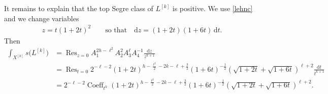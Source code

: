 It remains to explain that the top Segre class of $L^{[k]}$ is positive. We use \eqref{lehnc} and we change variables
\begin{gather*}
z=t(1+2t)^2\qquad \text{so that}\quad \mathrm dz=(1+2t)(1+6t)\,{\mathrm dt}.
\end{gather*}
Then
\begin{align}
\int_{X^{[k]}} s\big(L^{[k]}\big)&=\operatorname{Res}_{z=0} A_1^{2h-\ell^2} A_2^2 A_3^{\ell} A_4^{-1} \frac{\mathrm dz}{z^{k+1}}\nonumber
\\
\nonumber&=
\operatorname{Res}_{t=0} 2^{-\ell-2} (1+2t)^{h-\frac{\ell^2}{2}-2k-\ell+\frac{3}{2}} (1+6t)^{-\frac{1}{2}} \left(\sqrt{1+2t}+\sqrt{1+6t}\right)^{\ell+2}\frac{\mathrm dt}{t^{k+1}}
\\
&= 2^{-\ell-2} \operatorname{Coeff}_{t^k} (1\!+2t)^{h-\frac{\ell^2}{2}-2k-\ell+\frac{3}{2}} (1\!+6t)^{-\frac{1}{2}} \left(\sqrt{1+2t}\!+\sqrt{1+6t}\right)^{\ell+2}\!.
\label{cvvv}
\end{align}
